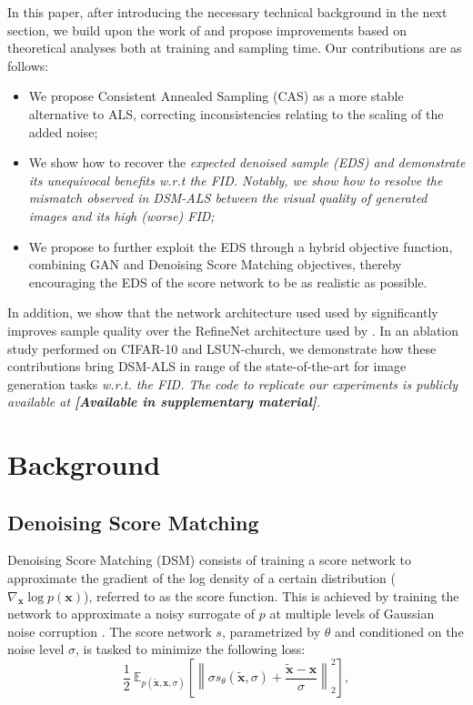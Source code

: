 \documentclass{article} \usepackage{iclr2021_conference_notitle,times}
\theoremstyle{definition}
\theoremstyle{definition}
\newcommand{\norm}[1]{\left\lVert#1\right\rVert}
\begin{document}
In this paper, after introducing the necessary technical background in the next section, we build upon the work of \citet{song2020improved} and propose improvements based on theoretical analyses both at training and sampling time. Our contributions are as follows:

\begin{itemize}
 \item We propose Consistent Annealed Sampling (CAS) as a more stable alternative to ALS, correcting inconsistencies relating to the scaling of the added noise;
 \item We show how to recover the \em expected denoised sample \em (EDS) and demonstrate its unequivocal benefits \em w.r.t \em the FID. Notably, we show how to resolve the mismatch observed in DSM-ALS between the visual quality of generated images and its high (worse) FID;
 \item We propose to further exploit the EDS through a hybrid objective function, combining GAN and Denoising Score Matching objectives, thereby encouraging the EDS of the score network to be as realistic as possible.
\end{itemize}

In addition, we show that the network architecture used used by \citet{ho2020denoising} significantly improves sample quality over the RefineNet \citep{lin2017refinenet} architecture used by \citet{song2020improved}. In an ablation study performed on CIFAR-10 and LSUN-church, we demonstrate how these contributions bring DSM-ALS in range of the state-of-the-art for image generation tasks \em w.r.t. \em the FID. The code to replicate our experiments is publicly available at 
\textbf{[Available in supplementary material]}.


\section{Background}\label{sec:back}

\subsection{Denoising Score Matching}

Denoising Score Matching (DSM) \citep{hyvarinen2005estimation} consists of training a score network to approximate the gradient of the log density of a certain distribution ($\nabla_{\boldsymbol{x}} \log p(\boldsymbol{x})$), referred to as the score function. This is achieved by training the network to approximate a noisy surrogate of $p$ at multiple levels of Gaussian noise corruption \citep{vincent2011connection}.
The score network $s$, parametrized by $\theta$ and conditioned on the noise level $\sigma$, is tasked to minimize the following loss:
\begin{equation}\label{eqn:score}
\frac{1}{2} ~ \mathbb{E}_{p(\boldsymbol{\tilde{x}}, 
\boldsymbol{x}, \sigma)}\left[ \norm{\sigma s_{\theta}(\boldsymbol{\tilde{x}},\sigma) + \frac{\boldsymbol{\tilde{x}} - \boldsymbol{x}}{\sigma} }_2^2 \right],
\end{equation}
\end{document}
